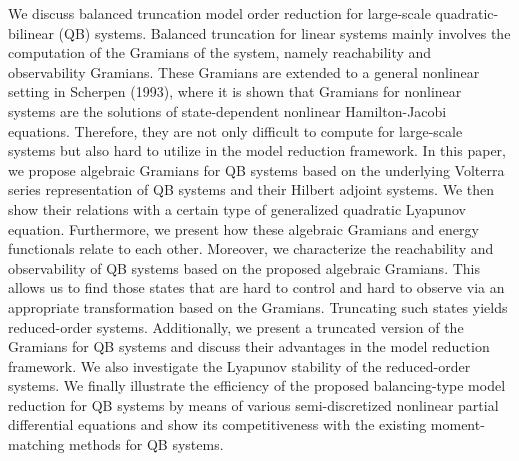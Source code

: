 We discuss balanced truncation  model order reduction for large-scale quadratic-bilinear (QB) systems. Balanced truncation for linear systems mainly involves the computation of the Gramians of the system, namely  reachability and observability Gramians. These Gramians are extended to a general nonlinear setting in Scherpen (1993), where it is shown that Gramians for nonlinear systems are the solutions of state-dependent nonlinear Hamilton-Jacobi equations. Therefore, they are not only  difficult to compute for large-scale systems but also hard to utilize in the model reduction framework. In this paper, we propose algebraic Gramians for  QB systems based on the underlying Volterra series representation of QB systems and their Hilbert adjoint  systems. We then show their relations with a certain type of generalized quadratic Lyapunov equation. Furthermore, we present how these algebraic Gramians and energy functionals relate to each other. Moreover, we  characterize the reachability and observability of QB systems based on the proposed algebraic Gramians.  This allows us to find those states that are hard to control and hard to observe via an appropriate transformation based on the Gramians. Truncating such states yields reduced-order systems.  Additionally, we present a truncated version of the Gramians for QB systems and discuss their advantages in the model reduction framework.  We also investigate the Lyapunov stability of the reduced-order systems. We finally illustrate the efficiency of  the proposed balancing-type model reduction for QB systems by means of various semi-discretized nonlinear partial differential equations and show its competitiveness with the existing moment-matching methods for QB systems.